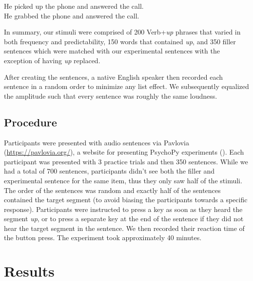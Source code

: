 \documentclass[
  12pt,
  letterpaper,
]{scrreprt}
\begin{document}
\begin{exe} 
\ex
  \begin{xlist}
  \begin{singlespace}
    \ex He picked up the phone and answered the call. \\
    \ex He grabbed the phone and answered the call. \\
  \end{singlespace}
  \end{xlist}
\end{exe}

In summary, our stimuli were comprised of 200 Verb+\emph{up} phrases
that varied in both frequency and predictability, 150 words that
contained \emph{up}, and 350 filler sentences which were matched with
our experimental sentences with the exception of having \emph{up}
replaced.

After creating the sentences, a native English speaker then recorded
each sentence in a random order to minimize any list effect. We
subsequently equalized the amplitude such that every sentence was
roughly the same loudness.

\subsection{Procedure}\label{procedure-3}

Participants were presented with audio sentences via Pavlovia
(\url{https://pavlovia.org/}), a website for presenting PsychoPy
experiments ().
Each participant was presented with 3 practice trials and then 350
sentences. While we had a total of 700 sentences, participants didn't
see both the filler and experimental sentence for the same item, thus
they only saw half of the stimuli. The order of the sentences was random
and exactly half of the sentences contained the target segment (to avoid
biasing the participants towards a specific response). Participants were
instructed to press a key as soon as they heard the segment \emph{up},
or to press a separate key at the end of the sentence if they did not
hear the target segment in the sentence. We then recorded their reaction
time of the button press. The experiment took approximately 40 minutes.

\section{Results}\label{results-4}
\end{document}
